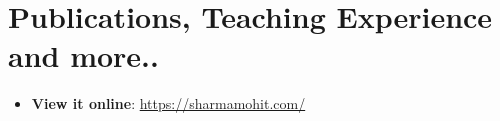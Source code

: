 \documentclass[letterpaper,10.5pt]{article}
\newcommand{\resumeItem}[2]{
\item\small{
\textbf{#1}{: #2 \vspace{-2pt}}
}
}
\newcommand{\resumePubItem}[3]{
\item\small{
\textbf{#1 \null\hfill{#2}}{#3} \vspace{-2pt}
}
}
\newcommand{\resumePublicationItem}[3]{\resumePubItem{#1}{#2}\newline{#3}\vspace{-4pt}}
\newcommand{\resumeSubHeadingListStart}{\begin{itemize}[leftmargin=*]}
\newcommand{\resumeSubHeadingListEnd}{\end{itemize}}
\newcommand{\resumeTilde}{\raise.17ex\hbox{$\scriptstyle\sim$}}
\begin{document}
\section{\color[HTML]{DF691A} Publications, Teaching Experience and more..}
\resumeSubHeadingListStart
\resumeItem{View it online}{\href{https://sharmamohit.com/work/}{https://sharmamohit.com/}}
\newline
\resumeSubHeadingListEnd
%
\end{document}
